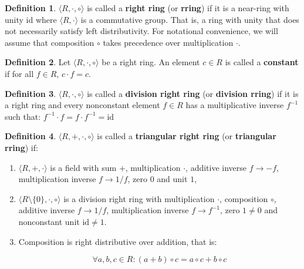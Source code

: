 \documentclass[12pt]{article}
\theoremstyle{definition}
\newtheorem{definition}{Definition}[section]
\begin{document}
\begin{definition} $\langle R, \cdot, \circ \rangle$ is called a \textbf{right ring} (or \textbf{rring}) if it is 
a near-ring with unity $\mathrm{id}$ where $\langle R, \cdot \rangle$ is a commutative group.  
That is, a ring with unity that does not necessarily satisfy left distributivity. 
For notational convenience, we will assume that composition $\circ$ takes precedence over multiplication $\cdot$.

\end{definition}

\vspace{5pt}
\begin{definition} Let $\langle R, \cdot, \circ \rangle$ be a right ring. An element $c \in R$ is called a \textbf{constant} if 
    for all $f \in R$, $c \cdot f = c$.
\end{definition}

\vspace{5pt}
\begin{definition} $\langle R, \cdot, \circ \rangle$ is called a \textbf{division right ring} (or \textbf{division rring}) 
    if it is a right ring and every nonconstant element $f \in R$ has a multiplicative inverse $f^{-1}$ 
    such that: $f^{-1} \cdot f = f \cdot f^{-1} = \mathrm{id}$  
\end{definition}

\vspace{5pt}
\begin{definition} $\langle R, +, \cdot, \circ \rangle$ is called a \textbf{triangular right ring} (or \textbf{triangular rring}) if:
\begin{enumerate}
\item $\langle R, +, \cdot \rangle$ is a field with sum $+$, multiplication $\cdot$, additive inverse $f \to -f$, multiplication inverse $f \to 1/f$, zero $0$ and unit $1$,
\item $\langle R \setminus \{0\}, \cdot, \circ \rangle$ is a division right ring with multiplication $\cdot$, composition $\circ$, 
additive inverse $f \to 1/f$, multiplication inverse $f \to f^{-1}$, zero $1 \neq 0$ and nonconstant unit $\mathrm{id} \neq 1$.  
\item Composition is right distributive over addition, that is:  

\[
\forall a, b, c \in R: (a + b) \circ c = a \circ c + b \circ c  
\]

\end{enumerate}
\end{definition}
\end{document}
